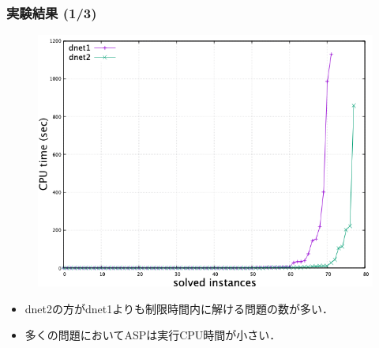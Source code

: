 \documentclass[dvipdfmx,11pt]{beamer}
\begin{document}
\begin{frame}\frametitle{実験結果 (1/3)}
 \begin{figure}[h]
  \centering
  \includegraphics[scale=0.4]{cactus.png}
 \end{figure}

\begin{itemize}
 \item dnet2の方がdnet1よりも制限時間内に解ける問題の数が多い．
 \item 多くの問題においてASPは実行CPU時間が小さい．
\end{itemize}
\end{frame}
\end{document}
